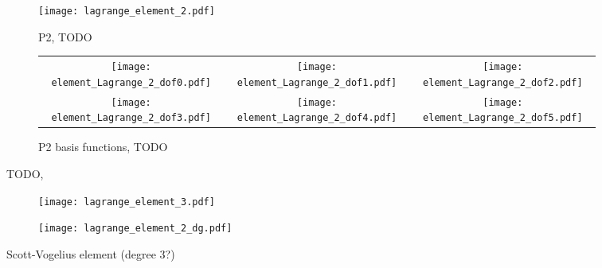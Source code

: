 \documentclass[thesis]{subfiles}
\begin{document}
\begin{figure}
  \begin{subfigure}{.3\textwidth}
    \texttt{[image: lagrange\_element\_2.pdf]}
    \caption{P2, TODO}
  \end{subfigure}
  \begin{subfigure}{.68\textwidth}
    \begin{tabular}{c c c}
      \texttt{[image: element\_Lagrange\_2\_dof0.pdf]}
      &
      \texttt{[image: element\_Lagrange\_2\_dof1.pdf]}
      &
      \texttt{[image: element\_Lagrange\_2\_dof2.pdf]}
      \\
      \texttt{[image: element\_Lagrange\_2\_dof3.pdf]}
      &
      \texttt{[image: element\_Lagrange\_2\_dof4.pdf]}
      &
      \texttt{[image: element\_Lagrange\_2\_dof5.pdf]}
    \end{tabular}
    \caption{P2 basis functions, TODO}
  \end{subfigure}
  \caption{TODO, \cite{defelement}}
\end{figure}



\begin{figure}
  \centering
  \hfill
  \begin{subfigure}{.4\textwidth}
    \texttt{[image: lagrange\_element\_3.pdf]}
  \end{subfigure}
  \hfill
  \begin{subfigure}{.4\textwidth}
    \texttt{[image: lagrange\_element\_2\_dg.pdf]}
  \end{subfigure}
  \hfill
  \caption{Scott-Vogelius element (degree 3?)}
  \label{fig:scott_vogelius_element}
\end{figure}

\end{document}
